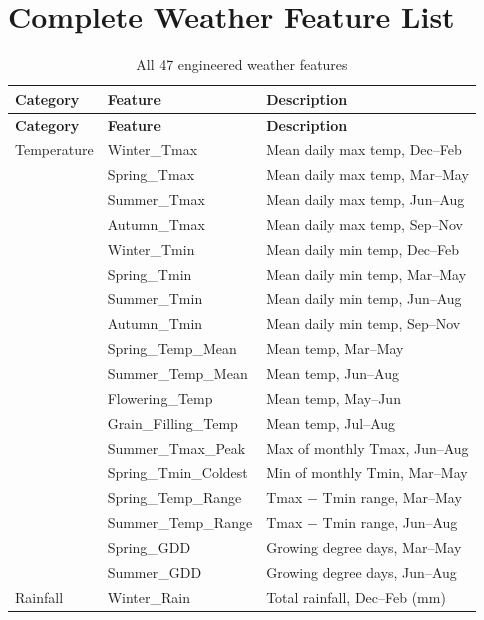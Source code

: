 \documentclass[12pt,a4paper]{report}
\begin{document}
\appendix

\chapter{Complete Weather Feature List}

\begin{longtable}{lll}
\caption{All 47 engineered weather features} \label{tab:all_features} \\
\toprule
\textbf{Category} & \textbf{Feature} & \textbf{Description} \\
\midrule
\endfirsthead
\toprule
\textbf{Category} & \textbf{Feature} & \textbf{Description} \\
\midrule
\endhead
\bottomrule
\endfoot
Temperature & Winter\_Tmax & Mean daily max temp, Dec--Feb \\
& Spring\_Tmax & Mean daily max temp, Mar--May \\
& Summer\_Tmax & Mean daily max temp, Jun--Aug \\
& Autumn\_Tmax & Mean daily max temp, Sep--Nov \\
& Winter\_Tmin & Mean daily min temp, Dec--Feb \\
& Spring\_Tmin & Mean daily min temp, Mar--May \\
& Summer\_Tmin & Mean daily min temp, Jun--Aug \\
& Autumn\_Tmin & Mean daily min temp, Sep--Nov \\
& Spring\_Temp\_Mean & Mean temp, Mar--May \\
& Summer\_Temp\_Mean & Mean temp, Jun--Aug \\
& Flowering\_Temp & Mean temp, May--Jun \\
& Grain\_Filling\_Temp & Mean temp, Jul--Aug \\
& Summer\_Tmax\_Peak & Max of monthly Tmax, Jun--Aug \\
& Spring\_Tmin\_Coldest & Min of monthly Tmin, Mar--May \\
& Spring\_Temp\_Range & Tmax $-$ Tmin range, Mar--May \\
& Summer\_Temp\_Range & Tmax $-$ Tmin range, Jun--Aug \\
& Spring\_GDD & Growing degree days, Mar--May \\
& Summer\_GDD & Growing degree days, Jun--Aug \\
\midrule
Rainfall & Winter\_Rain & Total rainfall, Dec--Feb (mm) \\

\end{longtable}
\end{document}
